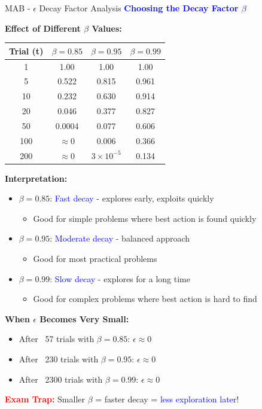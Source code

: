 \documentclass[8pt]{beamer}
\begin{document}
	\begin{frame}{MAB - $\epsilon$ Decay Factor Analysis}
		\fontsize{6.5}{7.5}\selectfont
		\textcolor{blue}{\textbf{Choosing the Decay Factor $\beta$}}
		
		\textbf{Effect of Different $\beta$ Values:}
		
		\begin{tabular}{|c|c|c|c|}
			\hline
			\textbf{Trial (t)} & $\beta = 0.85$ & $\beta = 0.95$ & $\beta = 0.99$ \\
			\hline
			1 & 1.00 & 1.00 & 1.00 \\
			\hline
			5 & 0.522 & 0.815 & 0.961 \\
			\hline
			10 & 0.232 & 0.630 & 0.914 \\
			\hline
			20 & 0.046 & 0.377 & 0.827 \\
			\hline
			50 & 0.0004 & 0.077 & 0.606 \\
			\hline
			100 & $\approx$0 & 0.006 & 0.366 \\
			\hline
			200 & $\approx$0 & $3\times10^{-5}$ & 0.134 \\
			\hline
		\end{tabular}
		
		\textbf{Interpretation:}
		\begin{itemize}
			\item $\beta = 0.85$: \textcolor{blue}{Fast decay} - explores early, exploits quickly
			\begin{itemize}
				\item Good for simple problems where best action is found quickly
			\end{itemize}
			\item $\beta = 0.95$: \textcolor{blue}{Moderate decay} - balanced approach
			\begin{itemize}
				\item Good for most practical problems
			\end{itemize}
			\item $\beta = 0.99$: \textcolor{blue}{Slow decay} - explores for a long time
			\begin{itemize}
				\item Good for complex problems where best action is hard to find
			\end{itemize}
		\end{itemize}
		
		\textbf{When $\epsilon$ Becomes Very Small:}
		\begin{itemize}
			\item After ~57 trials with $\beta=0.85$: $\epsilon \approx 0$
			\item After ~230 trials with $\beta=0.95$: $\epsilon \approx 0$
			\item After ~2300 trials with $\beta=0.99$: $\epsilon \approx 0$
		\end{itemize}
		
		\textcolor{red}{\textbf{Exam Trap:}} Smaller $\beta$ = faster decay = \textcolor{blue}{less exploration later}!
	\end{frame}
	
\end{document}
